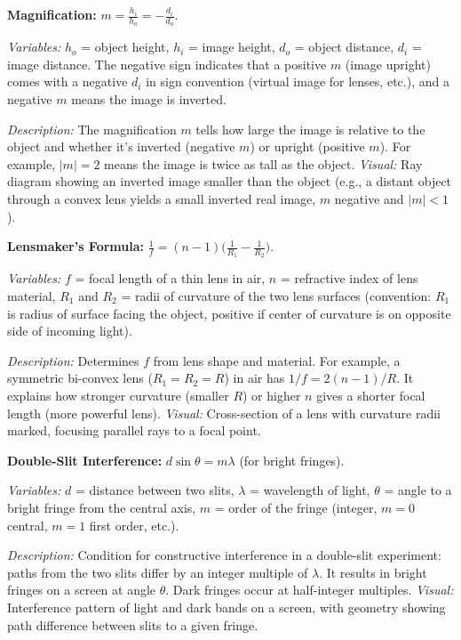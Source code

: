\documentclass{article}
\begin{document}
\textbf{Magnification:} $m = \frac{h_i}{h_o} = -\frac{d_i}{d_o}$.

\textit{Variables:} $h_o$ = object height, $h_i$ = image height, $d_o$ = object distance, $d_i$ = image distance. The negative sign indicates that a positive $m$ (image upright) comes with a negative $d_i$ in sign convention (virtual image for lenses, etc.), and a negative $m$ means the image is inverted.

\textit{Description:} The magnification $m$ tells how large the image is relative to the object and whether it’s inverted (negative $m$) or upright (positive $m$). For example, $|m|=2$ means the image is twice as tall as the object. \textit{Visual:} Ray diagram showing an inverted image smaller than the object (e.g., a distant object through a convex lens yields a small inverted real image, $m$ negative and $|m|<1$).

\textbf{Lensmaker’s Formula:} $\displaystyle \frac{1}{f} = (n-1)\Big(\frac{1}{R_1} - \frac{1}{R_2}\Big)$.

\textit{Variables:} $f$ = focal length of a thin lens in air, $n$ = refractive index of lens material, $R_1$ and $R_2$ = radii of curvature of the two lens surfaces (convention: $R_1$ is radius of surface facing the object, positive if center of curvature is on opposite side of incoming light).

\textit{Description:} Determines $f$ from lens shape and material. For example, a symmetric bi-convex lens ($R_1 = R_2 = R$) in air has $1/f = 2(n-1)/R$. It explains how stronger curvature (smaller $R$) or higher $n$ gives a shorter focal length (more powerful lens). \textit{Visual:} Cross-section of a lens with curvature radii marked, focusing parallel rays to a focal point.

\textbf{Double-Slit Interference:} $d \sin\theta = m \lambda$ (for bright fringes).

\textit{Variables:} $d$ = distance between two slits, $\lambda$ = wavelength of light, $\theta$ = angle to a bright fringe from the central axis, $m$ = order of the fringe (integer, $m=0$ central, $m=1$ first order, etc.).

\textit{Description:} Condition for constructive interference in a double-slit experiment: paths from the two slits differ by an integer multiple of $\lambda$. It results in bright fringes on a screen at angle $\theta$. Dark fringes occur at half-integer multiples. \textit{Visual:} Interference pattern of light and dark bands on a screen, with geometry showing path difference between slits to a given fringe.
\end{document}
